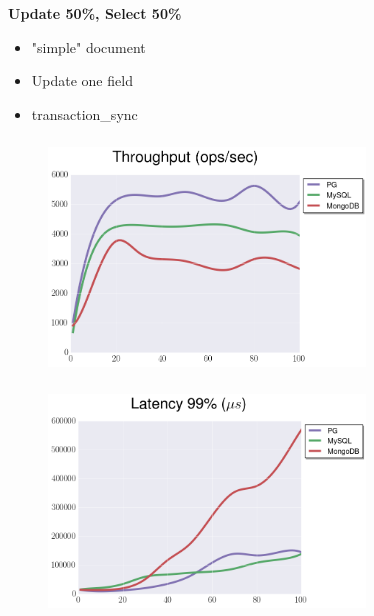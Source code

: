 \documentclass[usenames,dvipsnames, 18pt, compress, aspectratio=169]{beamer}
\begin{document}
\begin{frame}
    \frametitle{}
    \begin{center}
        \textbf{Update 50\%, Select 50\%}
        \begin{itemize}[label={}]
            \item "simple" document
            \item Update one field
            \item transaction\_sync
        \end{itemize}
    \end{center}
\end{frame}

\begin{frame}
    \frametitle{}
    \begin{center}
    \begin{figure}
        \includegraphics[width=0.75\textwidth,center]{benchmarks/update_btree_transaction_sync_throughput.png}
    \end{figure}
    \end{center}
\end{frame}

\begin{frame}
    \frametitle{}
    \begin{center}
    \begin{figure}
        \includegraphics[width=0.75\textwidth,center]{benchmarks/update_btree_transaction_sync_latency.png}
    \end{figure}
    \end{center}
\end{frame}
\end{document}
